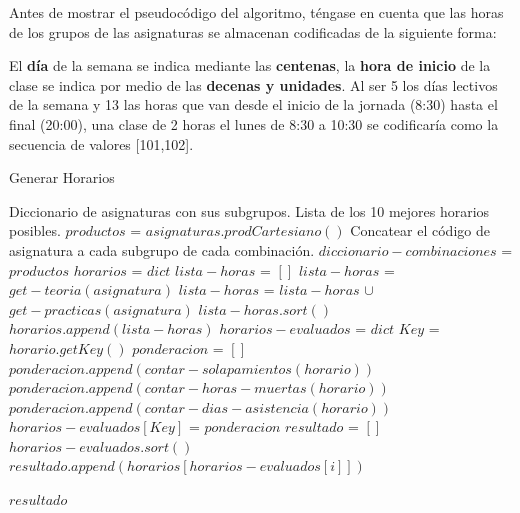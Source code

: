 Antes de mostrar el pseudocódigo del algoritmo, téngase en cuenta que las horas de los grupos de las asignaturas se almacenan codificadas de la siguiente forma:\newline

El \textbf{día} de la semana se indica mediante las \textbf{centenas}, la \textbf{hora de inicio} de la clase se indica por medio de las \textbf{decenas y unidades}. Al ser 5 los días lectivos de la semana y 13 las horas que van desde el inicio de la jornada (8:30) hasta el final (20:00), una clase de 2 horas el lunes de 8:30 a 10:30 se codificaría como la secuencia de valores [101,102].\newline

\begin{algorithm}
    \caption{Generar Horarios}
    \label{alg:generar_horarios}
    \begin{algorithmic}[1]
        \Require Diccionario de asignaturas con sus subgrupos.
        \Ensure Lista de los 10 mejores horarios posibles.
            \State $productos$ = $asignaturas.prodCartesiano()$
            \State Concatear el código de asignatura a cada subgrupo de cada combinación.
            \State $diccionario-combinaciones$ = $productos$
            \State $horarios$ = $dict$
                \State $lista-horas$ = $[]$
                    \State $lista-horas$ = $get-teoria(asignatura)$
                    \State $lista-horas$ = $lista-horas$ $\cup$ $get-practicas(asignatura)$
                \EndFor
                \State $lista-horas.sort()$ 
                \State $horarios.append(lista-horas)$ 
            \EndFor
            \State $horarios-evaluados$ = $dict$
                \State $Key$ = $horario.getKey()$    
                \State $ponderacion$ = $[]$
                \State $ponderacion.append(contar-solapamientos(horario))$
                \State $ponderacion.append(contar-horas-muertas(horario))$
                \State $ponderacion.append(contar-dias-asistencia(horario))$
                \State $horarios-evaluados[Key]$ = $ponderacion$
            \EndFor
            \State $resultado$ = $[]$ 
            \State $horarios-evaluados.sort()$ 
                \State $resultado.append(horarios[horarios-evaluados[i]])$
            \EndFor

            \Return $resultado$
        \EndFunction
    \end{algorithmic}
\end{algorithm}

